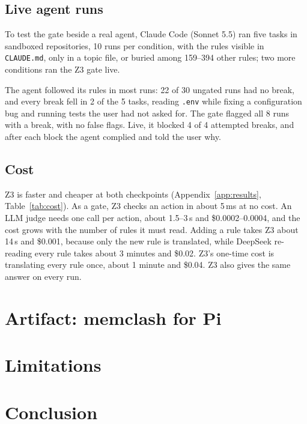 \documentclass[11pt]{article}
\begin{document}
\subsection{Live agent runs}

To test the gate beside a real agent, Claude Code (Sonnet 5.5) ran five tasks in sandboxed
repositories, 10 runs per condition, with the rules visible in \texttt{CLAUDE.md}, only in a topic
file, or buried among 159--394 other rules; two more conditions ran the Z3 gate live.

The agent followed its rules in most runs: 22 of 30 ungated runs had no break, and every break fell
in 2 of the 5 tasks, reading \texttt{.env} while fixing a configuration bug and running tests the
user had not asked for. The gate flagged all 8 runs with a break, with no false flags. Live, it
blocked 4 of 4 attempted breaks, and after each block the agent complied and told the user why.

\subsection{Cost}

Z3 is faster and cheaper at both checkpoints (Appendix~\ref{app:results}, Table~\ref{tab:cost}).
As a gate, Z3 checks an action in about 5\,ms at no cost. An LLM judge needs one call per action,
about 1.5--3\,s and \$0.0002--0.0004, and the cost grows with the number of rules it must read.
Adding a rule takes Z3 about 14\,s and \$0.001, because only the new rule is translated, while
DeepSeek re-reading every rule takes about 3 minutes and \$0.02. Z3's one-time cost is translating
every rule once, about 1 minute and \$0.04. Z3 also gives the same answer on every run.

\section{Artifact: memclash for Pi}

\section{Limitations}

\section{Conclusion}
\end{document}
